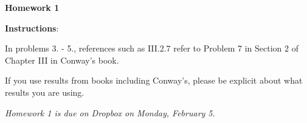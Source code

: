 \documentclass{article}%
\begin{document}
\begin{center}

\textbf{Homework 1}\bigskip

\end{center}



\noindent\textbf{Instructions}: 

\noindent In problems 3. - 5., references such as III.2.7 refer to Problem 7 in Section 2 of Chapter III in Conway's book.\smallskip



\noindent If you use results from books including Conway's, please be explicit about what results you are using.






\begin{center}

\emph{Homework 1 is due on Dropbox on Monday, February  5.}

\end{center} 

\medskip
\end{document}
